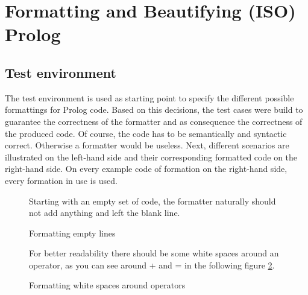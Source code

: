 \documentclass{article}
\begin{document}
 
\section{Formatting and Beautifying (ISO) Prolog} 
 \subsection{Test environment}
 The test environment is used as starting point to specify the different possible formattings for Prolog code. Based on this decisions, the test cases were build to guarantee the correctness of the formatter and as consequence the correctness of the produced code. Of course, the code has to be semantically and syntactic correct. Otherwise a formatter would be useless.  Next, different scenarios are illustrated on the left-hand side and their corresponding formatted code on the right-hand side. On every example code of formation on the right-hand side, every formation in use is used.
 
 
\begin{figure}[h]
Starting with an empty set of code, the formatter naturally should not add anything and left the blank line.\\

\begin{minipage}{.5\textwidth}

\end{minipage}
\hfill
\begin{minipage}{.5\textwidth}

\end{minipage}

\caption{Formatting empty lines}
\label{lst:empyt}
\end{figure}

 
\begin{figure}[h]
For better readability there should be some white spaces around an operator, as you can see around + and = in the following figure \ref{lst:operatorWhitespaces}.\\

\begin{minipage}{.5\textwidth}

\end{minipage}
\hfill
\begin{minipage}{.5\textwidth}

\end{minipage}

\caption{Formatting white spaces around operators}
\label{lst:operatorWhitespaces}
\end{figure}
 
\end{document}
